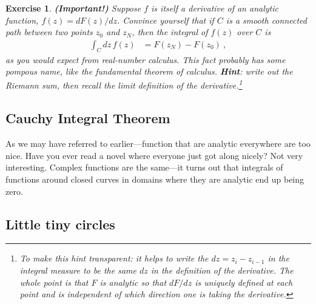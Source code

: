 \documentclass[
  11pt,
	colorful,
	raggedright,
]{tufte-style-thesis-flip}
\newtheorem{exercise}{Exercise}[section]
\begin{document}
\begin{exercise}\label{eq:fundamental:theorem:calculus} \textbf{(Important!)}
Suppose $f$ is itself a derivative of an analytic function, $f(z)=dF(z)/dz$.
Convince yourself that if $C$ is a smooth connected path between two points $z_0$ and $z_N$, then the integral of $f(z)$ over $C$ is
\begin{align}
  \int_C dz\, f(z) &= F(z_N) - F(z_0) \ ,
\end{align}
as you would expect from real-number calculus. This fact probably has some pompous name, like the fundamental theorem of calculus. \textbf{Hint}: write out the Riemann sum, then recall the limit definition of the derivative.\footnote{To make this hint transparent: it helps to write the $dz = z_i - z_{i-1}$ in the integral measure to be the same $dz$ in the definition of the derivative. The whole point is that $F$ is analytic so that $dF/dz$ is uniquely defined at each point and is independent of which direction one is taking the derivative.} 
\end{exercise}


 
\subsection{Cauchy Integral Theorem}

As we may have referred to earlier---function that are analytic everywhere are too nice. Have you ever read a novel where everyone just got along nicely? Not very interesting. Complex functions are the same---it turns out that integrals of functions around closed curves in domains where they are analytic end up being zero. 

\subsection{Little tiny circles}
\end{document}
